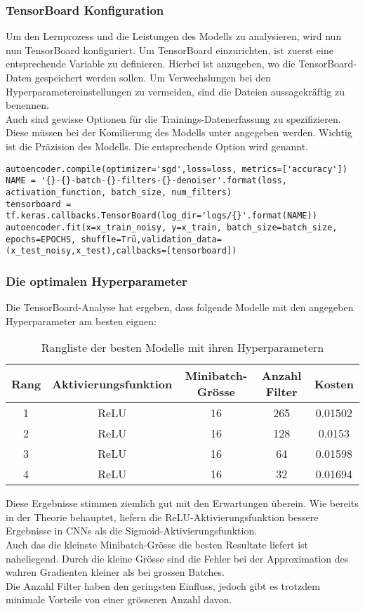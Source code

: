 \subsubsection{TensorBoard Konfiguration}
Um den Lernprozess und die Leistungen des Modells zu analysieren,
wird nun nun TensorBoard konfiguriert.
Um TensorBoard einzurichten, ist zuerst eine entsprechende
Variable zu definieren. Hierbei ist anzugeben, wo die TensorBoard-Daten
gespeichert werden sollen. Um Verwechslungen bei den Hyperparametereinstellungen
zu vermeiden, sind die Dateien aussagekräftig zu benennen. \\
Auch sind gewisse Optionen für die Trainings-Datenerfassung zu spezifizieren.
Diese müssen bei der Komilierung des Modells unter  angegeben
werden. Wichtig ist die Präzision des Modells. Die entsprechende Option wird  genannt.
\begin{verbatim}
autoencoder.compile(optimizer='sgd',loss=loss, metrics=['accuracy'])
NAME = '{}-{}-batch-{}-filters-{}-denoiser'.format(loss, activation_function, batch_size, num_filters)
tensorboard =
tf.keras.callbacks.TensorBoard(log_dir='logs/{}'.format(NAME))
autoencoder.fit(x=x_train_noisy, y=x_train, batch_size=batch_size, epochs=EPOCHS, shuffle=Trü,validation_data=(x_test_noisy,x_test),callbacks=[tensorboard])
\end{verbatim}

\subsubsection{Die optimalen Hyperparameter}
Die TensorBoard-Analyse hat ergeben, dass folgende Modelle mit den angegeben
Hyperparameter am besten eignen:
\para{}
\begin{table}[h!]
  \centering
  \begin{tabular}{ |c|c|c|c|c| }
    \hline
    Rang & Aktivierungsfunktion & Minibatch-Grösse & Anzahl Filter & Kosten \\
    \hline
    1 & ReLU & 16 & 265 & 0.01502 \\
    2 & ReLU & 16 & 128 & 0.0153 \\
    3 & ReLU & 16 & 64 & 0.01598 \\
    4 & ReLU & 16 & 32 & 0.01694 \\
    \hline
  \end{tabular}
  \caption{Rangliste der besten Modelle mit ihren Hyperparametern}
\end{table}
\para{}
Diese Ergebnisse stimmen ziemlich gut mit den Erwartungen überein. Wie bereits
in der Theorie behauptet, liefern die ReLU-Aktivierungsfunktion bessere Ergebnisse
in CNNs als die Sigmoid-Aktivierungsfunktion. \\
Auch das die kleinste Minibatch-Grösse die besten Resultate liefert ist
naheliegend. Durch die kleine Grösse sind die Fehler bei der Approximation des
wahren Gradienten kleiner als bei grossen Batches. \\
Die Anzahl Filter haben den geringsten Einfluss, jedoch gibt es trotzdem
minimale Vorteile von einer grösseren Anzahl davon.


